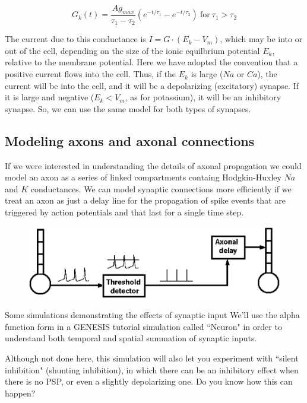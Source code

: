\documentclass[12pt]{article}
\begin{document}
\begin{displaymath}
	G_k(t) = \frac{Ag_{max}}{\tau_1 - \tau_2}(e^{-t/\tau_1} - e^{-t/\tau_2}) \mathrm{~for~} \tau_1 > \tau_2
\end{displaymath}

The current due to this conductance is $I = G\cdot (E_k - V_m)$, which may be into or out of the cell, depending on the size of the ionic equilbrium potential $E_k$, relative to the membrane potential. Here we have adopted the convention that a positive current flows into the cell. Thus, if the $E_k$ is large ($Na$ or $Ca$), the current will be into the cell, and it will be a depolarizing (excitatory) synapse. If it is large and negative ($E_k < V_m$, as for potassium), it will be an inhibitory synapse. So, we can use the same model for both types of synapses.

\subsection*{Modeling axons and axonal connections}

If we were interested in understanding the details of axonal propagation we could model an axon as a series of linked compartments containg Hodgkin-Huxley $Na$ and $K$ conductances. We can model synaptic connections more efficiently if we treat an axon as just a delay line for the propagation of spike events that are triggered by action potentials and that last for a single time step.

\begin{figure}[h]
  \centering
 \includegraphics[scale=0.5]{figures/syn-connect.eps}
  \label{fig:synconnect}
\end{figure}

Some simulations demonstrating the effects of synaptic input
We'll use the alpha function form in a GENESIS tutorial simulation called ``Neuron" in order to understand both temporal and spatial summation of synaptic inputs.

Although not done here, this simulation will also let you experiment with ``silent inhibition" (shunting inhibition), in which there can be an inhibitory effect when there is no PSP, or even a slightly depolarizing one. Do you know how this can happen?
\end{document}
